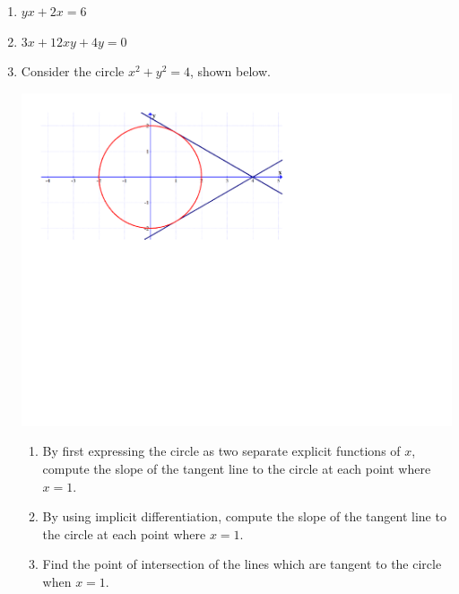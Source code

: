 \documentclass[12pt]{article}
\newif\ifans
\begin{document}
\begin{enumerate}

\item $yx+2x=6$ 

\ifans{\fbox{$y=\frac{6-2x}{x}$ for $x\neq 0$; $\frac{dy}{dx}=-6x^{-2}$}} \fi

\item $3x+12xy+4y=0$ 

\ifans{\fbox{$y=-\frac{3x}{12x+4}$ for $x\neq-\frac{1}{3}$; $\frac{dy}{dx}=\frac{-3}{4(3x+1)^2}$}} \fi

\item Consider the circle $x^2+y^2=4$, shown below.

\begin{center}
\includegraphics[scale=0.5]{circle.pdf}
\end{center}

\begin{enumerate}

\item By first expressing the circle as two separate explicit functions of $x$, compute the slope of the tangent line to the circle at each point where $x=1$.

\ifans{\fbox{$\left.\frac{dy}{dx}\right|_{(x,y)=\left(1,\sqrt{3}\right)}=-\frac{1}{\sqrt{3}}$ and $\left.\frac{dy}{dx}\right|_{(x,y)=\left(1,-\sqrt{3}\right)}=\frac{1}{\sqrt{3}}$}} \fi

\item By using implicit differentiation, compute the slope of the tangent line to the circle at each point where $x=1$.

\ifans{\fbox{$\left.\frac{dy}{dx}\right|_{(x,y)=\left(1,\sqrt{3}\right)}=-\frac{1}{\sqrt{3}}$ and $\left.\frac{dy}{dx}\right|_{(x,y)=\left(1,-\sqrt{3}\right)}=\frac{1}{\sqrt{3}}$}} \fi

\item Find the point of intersection of the lines which are tangent to the circle when $x=1$.

\ifans{\fbox{$(4,0)$}} \fi

\end{enumerate}

\end{enumerate}
\end{document}
